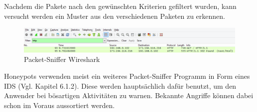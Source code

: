 Nachdem die Pakete nach den gewünschten Kriterien gefiltert wurden, kann versucht werden ein Muster aus den verschiedenen Paketen zu erkennen.\\

\begin{figure}[h]
    \centering\includegraphics[scale=0.5]{Bilder/Wireshark.png}
  \caption{Packet-Sniffer Wireshark }
  \label{ws}
\end{figure}

\noindent Honeypots verwenden meist ein weiteres Packet-Sniffer Programm in Form eines IDS (Vgl. Kapitel 6.1.2). Diese werden hauptsächlich dafür benutzt, um den Anwender bei bösartigen Aktivitäten zu warnen. Bekannte Angriffe können dabei schon im Voraus aussortiert werden.